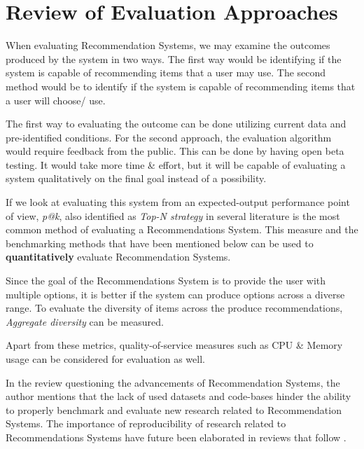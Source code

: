 \section{Review of Evaluation Approaches}
When evaluating Recommendation Systems, we may examine the outcomes produced by the system in two ways.
The first way would be identifying if the system is capable of recommending items that a user may use. The second method would be to identify if the system is capable of recommending items that a user will choose/ use.

\bigbreak
The first way to evaluating the outcome can be done utilizing current data and pre-identified conditions. For the second approach, the evaluation algorithm would require feedback from the public. This can be done by having open beta testing. It would take more time \& effort, but it will be capable of evaluating a system qualitatively on the final goal instead of a possibility.

If we look at evaluating this system from an expected-output performance point of view, \textit{\gls{p@k}}, also identified as \textit{Top-N strategy} in several literature is the most common method of evaluating a Recommendations System.
This measure and the benchmarking methods that have been mentioned below can be used to \textbf{quantitatively} evaluate Recommendation Systems.

Since the goal of the Recommendations System is to provide the user with multiple options, it is better if the system can produce options across a diverse range. To evaluate the diversity of items across the produce recommendations, \textit{Aggregate diversity} can be measured.

Apart from these metrics, quality-of-service measures such as CPU \& Memory usage can be considered for evaluation as well. 

\bigbreak
In the review questioning the advancements of Recommendation Systems, \autocite{dacrema_are_2019} the author mentions that the lack of used datasets and code-bases hinder the ability to properly benchmark and evaluate new research related to Recommendation Systems. The importance of reproducibility of research related to Recommendations Systems have future been elaborated in reviews that follow \autocite{dacrema_troubling_2021, ferrari_dacrema_critically_2020, dacrema_methodological_2020}.



